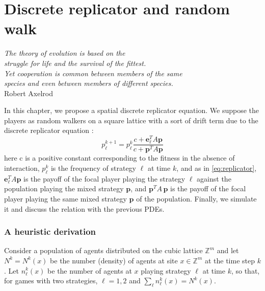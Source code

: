 
\part{Discrete replicator and random walk}
\noindent \begin{flushright}
\textit{The theory of evolution is based on the }\\
\textit{struggle for life and the survival of the fittest. }\\
\textit{Yet cooperation is common between members of the same }\\
\textit{species and even between members of different species.}\\
\textit{ }Robert Axelrod
\par\end{flushright}

In this chapter, we propose a spatial discrete replicator equation.
We suppose the players as random walkers on a square lattice with
a sort of drift term due to the discrete replicator equation \cite{hofbauer_evolutionary_1998}:
\[
p_{\ell}^{k+1}=p_{\ell}^{k}\frac{c+\mathbf{e}_{\ell}^{T}A\mathbf{p}}{c+\mathbf{p}^{T}A\mathbf{p}}
\]
here c is a positive constant corresponding to the fitness in the
absence of interaction, $p_{\ell}^{k}$ is the frequency of strategy
$\ell$ at time $k$, and as in \ref{eq:replicator}, $\mathbf{e}_{\ell}^{T}A\mathbf{p}$
is the payoff of the focal player playing the strategy $\ell$ against
the population playing the mixed strategy $\mathbf{p}$, and $\mathbf{p}^{T}A\,\mathbf{p}$
is the payoff of the focal player playing the same mixed strategy
$\mathbf{p}$ of the population. Finally, we simulate it and discuss
the relation with the previous PDEs.

\section{A heuristic derivation\label{sec:A-heuristic-derivation} }

Consider a population of agents distributed on the cubic lattice $\mathbb{Z}^{m}$
and let $N^{k}=N^{k}\left(x\right)$ be the number (density) of agents
at site $x\in\mathbb{Z}^{m}$ at the time step $k$. Let $n_{\ell}^{k}\left(x\right)$
be the number of agents at $x$ playing strategy $\ell$ at time $k$,
so that, for games with two strategies, $\ell=1,2$ and $\sum_{\ell}n_{\ell}^{k}\left(x\right)=N^{k}\left(x\right)$.

